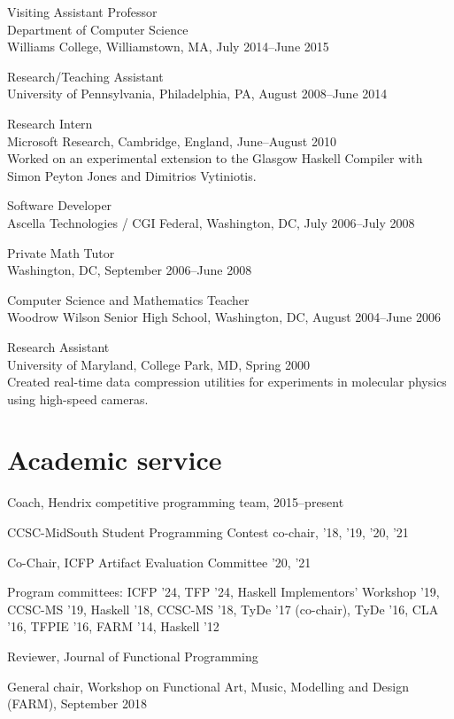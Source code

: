 \documentclass[12pt]{article}
\newcommand{\cvitem}{\par\hangpara{2em}{1}}
\begin{document}
\cvitem
Visiting Assistant Professor \\
Department of Computer Science \\
Williams College, Williamstown, MA, July 2014--June 2015

\cvitem
Research/Teaching Assistant \\
University of Pennsylvania, Philadelphia, PA, August 2008--June 2014

\cvitem
Research Intern \\
Microsoft Research, Cambridge, England, June--August 2010 \\
Worked on an experimental extension to the Glasgow Haskell Compiler with
Simon Peyton Jones and Dimitrios Vytiniotis.

\cvitem
Software Developer \\
Ascella Technologies / CGI Federal, Washington,
DC, July 2006--July 2008

\cvitem
Private Math Tutor \\
Washington, DC, September 2006--June 2008

\cvitem
Computer Science and Mathematics Teacher \\
Woodrow Wilson Senior High School, Washington, DC, August 2004--June 2006

\cvitem
Research Assistant \\
University of Maryland, College Park, MD, Spring 2000 \\
Created real-time data compression utilities for experiments in
molecular physics using high-speed cameras.

\section*{Academic service}

\cvitem Coach, Hendrix competitive programming team, 2015--present

\cvitem CCSC-MidSouth Student Programming Contest co-chair, '18, '19, '20, '21

\cvitem Co-Chair, ICFP Artifact Evaluation Committee '20, '21

\cvitem Program committees: ICFP '24, TFP '24, Haskell Implementors' Workshop '19,
CCSC-MS '19, Haskell '18, CCSC-MS '18, TyDe '17 (co-chair), TyDe '16,
CLA '16, TFPIE '16, FARM '14, Haskell '12

\cvitem Reviewer, Journal of Functional Programming

\cvitem General chair, Workshop on Functional Art, Music, Modelling
and Design (FARM), September 2018
\end{document}
